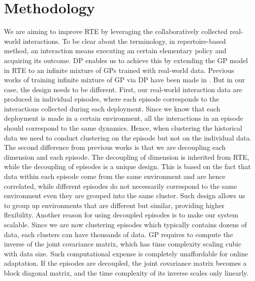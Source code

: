 
\section{Methodology}
We are aiming to improve RTE by leveraging the collaboratively collected real-world interactions.
To be clear about the terminology, in repertoire-based method, an interaction means executing an certain elementary policy and acquiring its outcome.
DP enables us to achieve this by extending the GP model in RTE to an infinite mixture of GPs trained with real-world data.
Previous works of training infinite mixture of GP via DP have been made in \cite{infinite_MGP, variational_MGP}. 
But in our case, the design needs to be different.
First, our real-world interaction data are produced in individual episodes, where each episode corresponds to the interactions collected during each deployment.
Since we know that each deployment is made in a certain environment, all the interactions in an episode should correspond to the same dynamics. 
Hence, when clustering the historical data we need to conduct clustering on the episode but not on the individual data. 
The second difference from previous works is that we are decoupling each dimension and each episode.
The decoupling of dimension is inherited from RTE, while the decoupling of episodes is a unique design.
This is based on the fact that data within each episode come from the same environment and are hence correlated, while different episodes do not necessarily correspond to the same environment even they are grouped into the same cluster.
Such design allows us to group up environments that are different but similar, providing higher flexibility.
Another reason for using decoupled episodes is to make our system scalable.
Since we are now clustering episodes which typically contains dozens of data, each clusters can have thousands of data.
GP requires to compute the inverse of the joint covariance matrix, which has time complexity scaling cubic with data size.
Such computational expense is completely unaffordable for online adaptation. 
If the episodes are decoupled, the joint covariance matrix becomes a block diagonal matrix, and the time complexity of its inverse scales only linearly.




